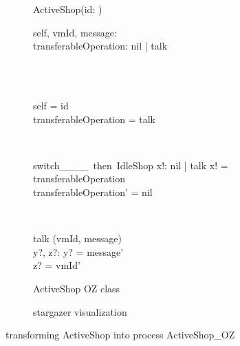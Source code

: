 \begin{figure}[H]
\begin{subfigure}{.6\textwidth}
\centering
\begin{class}{ActiveShop(id: \integer)}
\\
\begin{state}
self, vmId, message: \integer
\\transferableOperation: nil | talk
\end{state} 
\\
\begin{init}
\\self = id
\\transferableOperation = talk
\end{init} 
\\
\begin{op}{switch\_\_\_\_\ then\ IdleShop}
x!: nil | talk
\ST
x! = transferableOperation
\\transferableOperation' = nil
\end{op}
\\
\begin{op}{talk}
\Delta (vmId, message)
\\y?, z?: \integer
\ST
y? = message'
\\z? = vmId'
\end{op}
\end{class}
  \caption{ActiveShop OZ class}
\end{subfigure}%
\begin{subfigure}{.4\textwidth}
  \centering
{}
  \caption{stargazer visualization}
\end{subfigure}
\caption{transforming ActiveShop into \picalc{} process ActiveShop\_OZ}
\label{tra_activeShop_OZ}
\end{figure}


